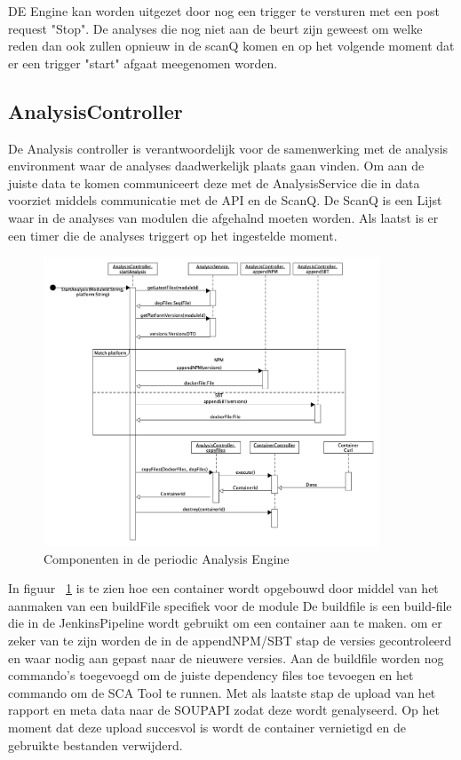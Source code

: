 DE Engine kan worden uitgezet door nog een trigger te versturen met een post request "Stop". De analyses die nog niet aan de beurt zijn geweest om welke reden dan ook zullen opnieuw in de scanQ komen en op het volgende moment dat er een trigger "start" afgaat meegenomen worden.


\subsection{AnalysisController}\label{subsec:analysiscontroller}
De Analysis controller is verantwoordelijk voor de samenwerking met de analysis environment waar de analyses daadwerkelijk plaats gaan vinden. Om aan de juiste data te komen communiceert deze met de AnalysisService die in data voorziet middels communicatie met de API en de ScanQ. De ScanQ is een Lijst waar in de analyses van modulen die afgehalnd moeten worden. Als laatst is er een timer die de analyses triggert op het ingestelde moment.

\begin{figure}[bth]
    \myfloatalign
    \includegraphics[width=10cm]{gfx/umlet/exports/PAE-CreateContainer}
    \caption{Componenten in de periodic Analysis Engine}
    \label{fig:paeSeq}
\end{figure}
In figuur ~\ref{fig:paeSeq} is te zien hoe een container wordt opgebouwd door middel van het aanmaken van een buildFile specifiek voor de module De buildfile is een build-file die in de JenkinsPipeline wordt gebruikt om een container aan te maken. om er zeker van te zijn worden de in de appendNPM/SBT stap de versies gecontroleerd en waar nodig aan gepast naar de nieuwere versies. Aan de buildfile worden nog commando's toegevoegd om de juiste dependency files toe tevoegen en het commando om de SCA Tool te runnen. Met als laatste stap de upload van het rapport en meta data naar de SOUPAPI zodat deze wordt genalyseerd. Op het moment dat deze upload succesvol is wordt de container vernietigd en de gebruikte bestanden verwijderd.
%

